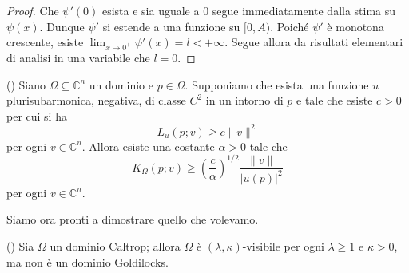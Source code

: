 \begin{proof}
    Che $\psi'(0)$ esista e sia uguale a $0$ segue immediatamente dalla stima su $\psi(x)$. Dunque $\psi'$ si estende a una funzione su $[0,A)$. Poiché $\psi'$ è monotona crescente, esiste $\displaystyle\lim_{x\longrightarrow0^+}\psi'(x)=l<+\infty$. Segue allora da risultati elementari di analisi in una variabile che $l=0$.
\end{proof}

\begin{lm}
    (\cite[Result 2.6]{BM}) Siano $\Omega\subseteq\mathbb{C}^n$ un dominio e $p\in\Omega$. Supponiamo che esista una funzione $u$ plurisubarmonica, negativa, di classe $C^2$ in un intorno di $p$ e tale che esiste $c>0$ per cui si ha
    $$L_u(p;v) \ge c\|v\|^2$$
    per ogni $v\in\mathbb{C}^n$. Allora esiste una costante $\alpha>0$ tale che
    $$K_\Omega(p;v)\ge\left(\frac{c}{\alpha}\right)^{1/2}\frac{\|v\|}{|u(p)|^2}$$
    per ogni $v\in\mathbb{C}^n$.
\end{lm}

Siamo ora pronti a dimostrare quello che volevamo.

\begin{thm}
    (\cite[Theorem 1.4]{BM}) Sia $\Omega$ un dominio Caltrop; allora $\Omega$ è $(\lambda,\kappa)$-visibile per ogni $\lambda \ge 1$ e $\kappa>0$, ma non è un dominio Goldilocks.
\end{thm}

